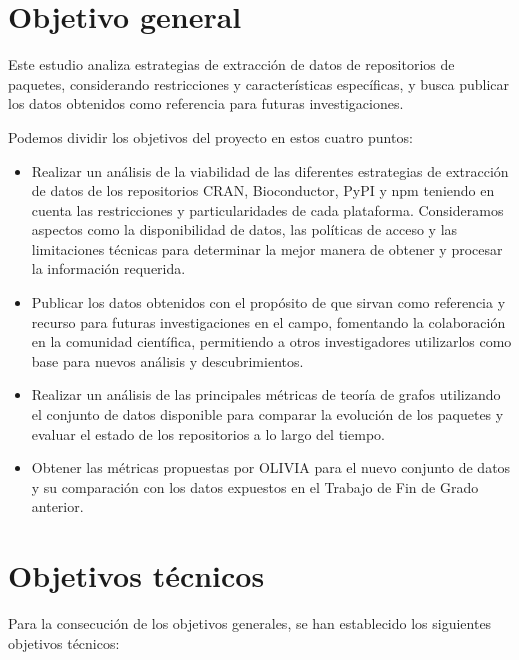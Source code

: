 

\section{Objetivo general}

Este estudio analiza estrategias de extracción de datos de repositorios 
de paquetes, considerando restricciones y características específicas, y busca publicar 
los datos obtenidos como referencia para futuras investigaciones.

Podemos dividir los objetivos del proyecto en estos cuatro puntos:

\begin{itemize}
    \item Realizar un análisis de la viabilidad de las diferentes estrategias de extracción de datos de los repositorios CRAN, Bioconductor, PyPI y npm teniendo en cuenta las restricciones y particularidades de cada plataforma. Consideramos aspectos como la disponibilidad de datos, las políticas de acceso y las limitaciones técnicas para determinar la mejor manera de obtener y procesar la información requerida.
    \item Publicar los datos obtenidos con el propósito de que sirvan como referencia y recurso para futuras investigaciones en el campo, fomentando la colaboración en la comunidad científica, permitiendo a otros investigadores utilizarlos como base para nuevos análisis y descubrimientos.
    \item Realizar un análisis de las principales métricas de teoría de grafos utilizando el conjunto de datos disponible para comparar la evolución de los paquetes y evaluar el estado de los repositorios a lo largo del tiempo.
    \item Obtener las métricas propuestas por OLIVIA para el nuevo conjunto de datos y su comparación con los datos expuestos en el Trabajo de Fin de Grado anterior.
    \end{itemize}


\section{Objetivos técnicos}

Para la consecución de los objetivos generales, se han establecido los siguientes objetivos técnicos:

